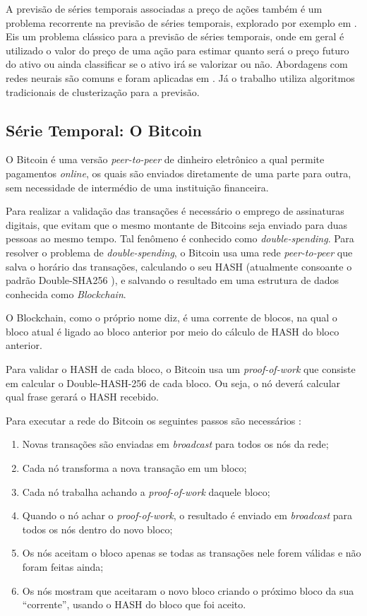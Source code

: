 A previsão de séries temporais associadas a preço de ações também é um problema recorrente na previsão de séries temporais, explorado por exemplo em \cite{8410278, 7310722}. Eis um problema clássico para a previsão de séries temporais, onde em geral é utilizado o valor do preço de uma ação para estimar quanto será o preço futuro do ativo ou ainda classificar se o ativo irá se valorizar ou não. Abordagens com redes neurais são comuns e foram aplicadas em \cite{8410278}. Já o trabalho \cite{7310722} utiliza algoritmos tradicionais de clusterização para a previsão.

\subsection{Série Temporal: O Bitcoin}
 
 O Bitcoin \cite{nakamoto2008bitcoin} é uma versão \emph{peer-to-peer} de dinheiro eletrônico a qual permite pagamentos \emph{online}, os quais são enviados diretamente de uma parte para outra, sem necessidade de intermédio de uma instituição financeira. 
 
 Para realizar a validação das transações é necessário o emprego de assinaturas digitais, que evitam que o mesmo montante de Bitcoins seja enviado para duas pessoas ao mesmo tempo. Tal fenômeno é conhecido como \textit{double-spending}. Para  resolver o problema de \textit{ double-spending}, o Bitcoin usa uma rede \emph{peer-to-peer} que salva o horário das transações, calculando o seu HASH (atualmente consoante o padrão Double-SHA256 \cite{bitcoinwikihashcash}), e salvando o resultado em uma estrutura de dados conhecida como \textit{Blockchain}.
 
O Blockchain, como o próprio nome diz, é uma corrente de blocos, na qual o bloco atual é ligado ao bloco anterior por meio do cálculo de HASH do bloco anterior. 

Para validar o HASH de cada bloco, o Bitcoin usa um \textit{proof-of-work} que consiste em calcular o Double-HASH-256 de cada bloco. Ou seja, o nó deverá calcular qual frase gerará o HASH recebido.

Para executar a rede do Bitcoin os seguintes passos são necessários :
\begin{enumerate}
\item Novas transações são enviadas em \textit{broadcast} para todos os nós da rede;
\item Cada nó transforma a nova transação em um bloco;
\item Cada nó trabalha achando a \textit{proof-of-work} daquele bloco;
\item Quando o nó achar o \textit{proof-of-work}, o resultado é enviado em \textit{broadcast} para todos os nós dentro do novo bloco;
\item Os nós aceitam o bloco apenas se todas as transações nele forem válidas e não foram feitas ainda;
\item Os nós mostram que aceitaram o novo bloco criando o próximo bloco da sua ``corrente'', usando o HASH do bloco que foi aceito.
\end{enumerate}

